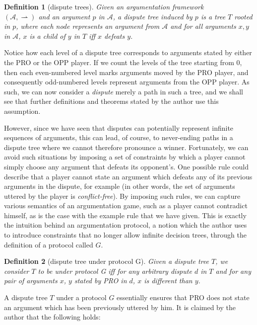 \documentclass[12pt, a4paper]{article}
\newcommand{\df}{\ensuremath{\rightharpoonup}}
\newtheorem{Def}{Definition}[subsection]
\begin{document}
\begin{Def}[dispute trees]
	Given an argumentation framework\\ $(\mathcal{A}, \df)$ and an argument $p$ in $\mathcal{A}$, a dispute tree induced by $p$ is a tree $T$ rooted in $p$, where each node represents an argument from $\mathcal{A}$ and for all arguments $x, y$ in $\mathcal{A}$, $x$ is a child of $y$ in $T$ iff $x$ defeats $y$.
\end{Def}

Notice how each level of a dispute tree corresponds to arguments stated by either the PRO or the OPP player. If we count the levels of the tree starting from 0, then each even-numbered level marks arguments moved by the PRO player, and consequently odd-numbered levels represent arguments from the OPP player. As such, we can now consider a \emph{dispute} merely a path in such a tree, and we shall see that further definitions and theorems stated by the author use this assumption.


However, since we have seen that disputes can potentially represent infinite sequences of arguments, this can lead, of course, to never-ending paths in a dispute tree where we cannot therefore pronounce a winner. Fortunately, we can avoid such situations by imposing a set of constraints by which a player cannot simply choose any argument that defeats its opponent's. One possible rule could describe that a player cannot state an argument which defeats any of its previous arguments in the dispute, for example (in other words, the set of arguments uttered by the player is \emph{conflict-free}). By imposing such rules, we can capture various semantics of an argumentation game, such as a player cannot contradict himself, as is the case with the example rule that we have given. This is exactly the intuition behind an argumentation protocol, a notion which the author uses to introduce constraints that no longer allow infinite decision trees, through the definition of a protocol called $G$.

\begin{Def}[dispute tree under protocol G]\label{protG}
	Given a dispute tree $T$, we consider $T$ to be under protocol G iff for any arbitrary dispute $d$ in $T$ and for any pair of arguments $x$, $y$ stated by PRO in $d$, $x$ is different than $y$.
\end{Def}

A dispute tree $T$ under a protocol $G$ essentially ensures that PRO does not state an argument which has been previously uttered by him. It is claimed by the author that the following holds:
\end{document}
